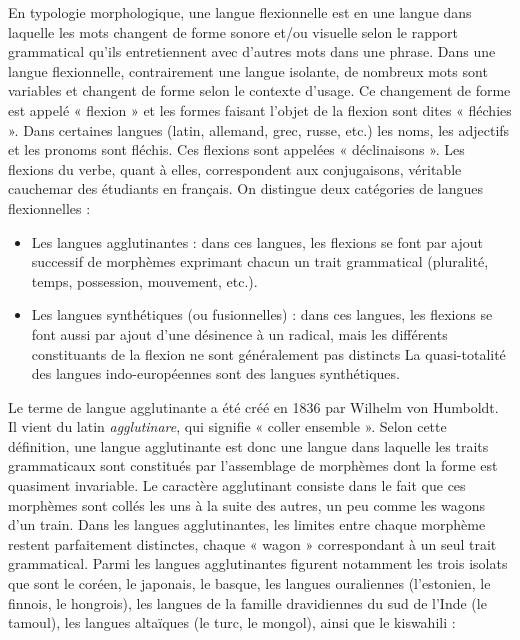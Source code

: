 En typologie morphologique, une langue flexionnelle est en une langue dans laquelle les mots changent de forme sonore et/ou visuelle selon le rapport grammatical qu’ils entretiennent avec d’autres mots dans une phrase. Dans une langue flexionnelle, contrairement une langue isolante, de nombreux mots sont variables et changent de forme selon le contexte d’usage. Ce changement de forme est appelé « flexion » et les formes faisant l’objet de la flexion sont dites « fléchies ». Dans certaines langues (latin, allemand, grec, russe, etc.) les noms, les adjectifs et les pronoms sont fléchis. Ces flexions sont appelées « déclinaisons ». Les flexions du verbe, quant à elles, correspondent aux conjugaisons, véritable cauchemar des étudiants en français. On distingue deux catégories de langues flexionnelles :
\begin{itemize}
\item Les langues agglutinantes : dans ces langues, les flexions se font par ajout successif de morphèmes exprimant chacun un trait grammatical (pluralité, temps, possession, mouvement, etc.).
\item Les langues synthétiques (ou fusionnelles) : dans ces langues, les flexions se font aussi par ajout d’une désinence à un radical, mais les différents constituants de la flexion ne sont généralement pas distincts La quasi-totalité des langues indo-européennes sont des langues synthétiques.
\end{itemize}

Le terme de langue agglutinante a été créé en 1836 par Wilhelm von Humboldt. Il vient du latin \textit{agglutinare}, qui signifie « coller ensemble ». Selon cette définition, une langue agglutinante est donc une langue dans laquelle les traits grammaticaux sont constitués par l’assemblage de morphèmes dont la forme est quasiment invariable. Le caractère agglutinant consiste dans le fait que ces morphèmes sont collés les uns à la suite des autres, un peu comme les wagons d’un train. Dans les langues agglutinantes, les limites entre chaque morphème restent parfaitement distinctes, chaque « wagon » correspondant à un seul trait grammatical. Parmi les langues agglutinantes figurent notamment les trois isolats que sont le coréen, le japonais, le basque, les langues ouraliennes (l’estonien, le finnois, le hongrois), les langues de la famille dravidiennes du sud de l’Inde (le tamoul), les langues altaïques (le turc, le mongol), ainsi que le kiswahili :

